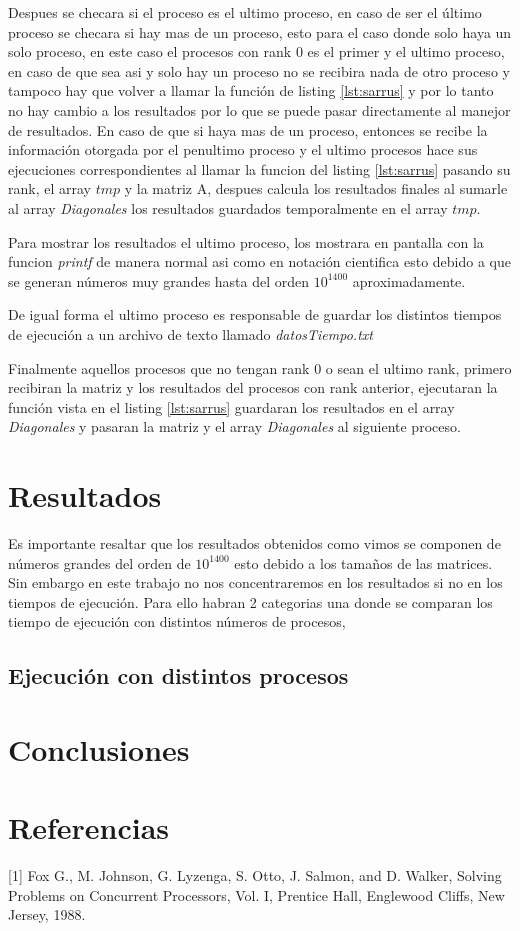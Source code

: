 \documentclass[10pt]{IEEEtran}
\begin{document}
Despues se checara si el proceso es el ultimo proceso, en caso de ser el último proceso se checara si hay mas de un proceso, esto para el caso donde solo haya un solo proceso, en este caso el procesos con rank 0 es el primer y el ultimo proceso, en caso de que sea asi y solo hay un proceso no se recibira nada de otro proceso y tampoco hay que volver a llamar la función de listing \ref{lst:sarrus} y por lo tanto no hay cambio a los resultados por lo que se puede pasar directamente al manejor de resultados. En caso de que si haya mas de un proceso, entonces se recibe la información otorgada por el penultimo proceso y el ultimo procesos hace sus ejecuciones correspondientes al llamar la funcion del listing \ref{lst:sarrus} pasando su rank, el array $tmp$ y la matriz A, despues calcula los resultados finales al sumarle al array \textit{Diagonales} los resultados guardados temporalmente en el array $tmp$.

Para mostrar los resultados el ultimo proceso, los mostrara en pantalla con la funcion \textit{printf} de manera normal asi como en notación cientifica esto debido a que se generan números muy grandes hasta del orden $10^{1400}$ aproximadamente.

De igual forma el ultimo proceso es responsable de guardar los distintos tiempos de ejecución a un archivo de texto llamado \textit{datosTiempo.txt}

Finalmente aquellos procesos que no tengan rank $0$ o sean el ultimo rank, primero recibiran la matriz y los resultados del procesos con rank anterior, ejecutaran la función vista en el listing \ref{lst:sarrus} guardaran los resultados en el array \textit{Diagonales} y pasaran la matriz y el array \textit{Diagonales} al siguiente proceso.

\section{Resultados}
Es importante resaltar que los resultados obtenidos como vimos se componen de números grandes del orden de $10^{1400}$ esto debido a los tamaños de las matrices. Sin embargo en este trabajo no nos concentraremos en los resultados si no en los tiempos de ejecución. Para ello habran 2 categorias una donde se comparan los tiempo de ejecución con distintos números de procesos,

\subsection{Ejecución con distintos procesos}

\section{Conclusiones}

\section{Referencias}
{[1]} Fox G., M. Johnson, G. Lyzenga, S. Otto, J. Salmon, and D. Walker, Solving Problems on Concurrent Processors, Vol. I, Prentice Hall, Englewood Cliffs, New Jersey, 1988.
\end{document}
